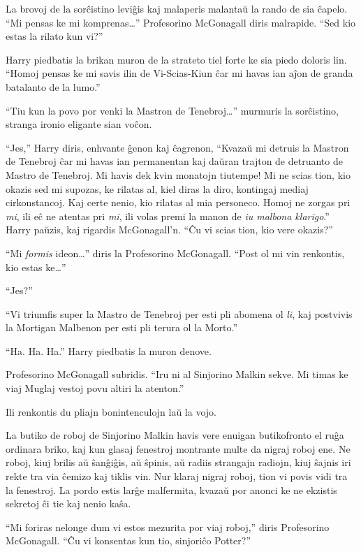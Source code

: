 La brovoj de la sorĉistino leviĝis kaj malaperis malantaŭ la rando
de sia ĉapelo. ``Mi pensas ke mi komprenas\ldots'' Profesorino
McGonagall diris malrapide. ``Sed kio estas la rilato kun vi?''

Harry piedbatis la brikan muron de la strateto tiel forte ke sia piedo
doloris lin. ``Homoj pensas ke mi savis ilin de Vi-Scias-Kiun ĉar mi
havas ian aĵon de granda batalanto de la lumo.''

``Tiu kun la povo por venki la Mastron de Tenebroj\ldots'' murmuris
la sorĉistino, stranga ironio eligante sian voĉon.

``Jes,'' Harry diris, enhvante ĝenon kaj ĉagrenon, ``Kvazaŭ mi detruis
la Mastron de Tenebroj ĉar mi havas ian permanentan kaj daŭran trajton
de detruanto de Mastro de Tenebroj. Mi havis dek kvin monatojn
tiutempe! Mi ne scias tion, kio okazis sed mi supozas, ke rilatas
al, kiel diras la diro, kontingaj mediaj cirkonstancoj. Kaj certe
nenio, kio rilatas al mia personeco. Homoj ne zorgas pri \emph{mi},
ili eĉ ne atentas pri \emph{mi}, ili volas premi la manon de
\emph{iu malbona klarigo}.''  Harry paŭzis, kaj rigardis
McGonagall'n. ``Ĉu vi scias tion, kio vere okazis?''

``Mi \emph{formis} ideon\ldots'' diris la Profesorino
McGonagall. ``Post ol mi vin renkontis, kio estas ke\ldots''

``Jes?''

``Vi triumfis super la Mastro de Tenebroj per esti pli abomena ol
\emph{li}, kaj postvivis la Mortigan Malbenon per esti pli terura ol
la Morto.''

``Ha. Ha. Ha.'' Harry piedbatis la muron denove.

Profesorino McGonagall subridis. ``Iru ni al Sinjorino Malkin
sekve. Mi timas ke viaj Muglaj vestoj povu altiri la atenton.''

Ili renkontis du pliajn bonintenculojn laŭ la vojo.

La butiko de roboj de Sinjorino Malkin havis vere enuigan butikofronto
el ruĝa ordinara briko, kaj kun glasaj fenestroj montrante multe da
nigraj roboj ene. Ne roboj, kiuj brilis aŭ ŝanĝiĝis, aŭ ŝpinis, aŭ
radiis strangajn radiojn, kiuj ŝajnis iri rekte tra via ĉemizo kaj
tiklis vin. Nur klaraj nigraj roboj, tion vi povis vidi tra la
fenestroj. La pordo estis larĝe malfermita, kvazaŭ por anonci ke ne
ekzistis sekretoj ĉi tie kaj nenio kaŝa.

``Mi foriras nelonge dum vi estos mezurita por viaj roboj,''
diris Profesorino McGonagall. ``Ĉu vi konsentas kun tio, sinjoriĉo
Potter?''

